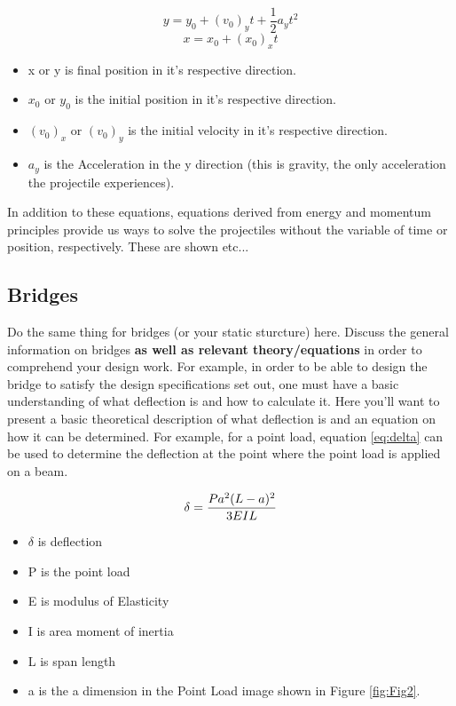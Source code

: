 \documentclass[fleqn,12pt]{project}
\begin{document}
\begin{equation}
	y = y_0 + (v_0)_yt + \frac{1}{2}a_yt^2
\label{eq:y}
\end{equation}
\begin{equation}
	x = x_0 + (x_0)_xt
\label{eq:x}
\end{equation}
\begin{itemize}
\item x or y is final position in it's respective direction.
\item $x_0$ or $y_0$ is the initial position in it's respective direction.
\item $(v_0)_x$ or $(v_0)_y$ is the initial velocity in it's respective direction.
\item $a_y$ is the Acceleration in the y direction (this is gravity, the only acceleration the projectile experiences).
\end{itemize}


In addition to these equations, equations derived from energy and momentum principles provide us ways to solve the projectiles without the variable of time or position, respectively. These are shown etc...
\subsection{Bridges}

Do the same thing for bridges (or your static sturcture) here. Discuss the general information on bridges \textbf{as well as relevant theory/equations} in order to comprehend your design work. For example, in order to be able to design the bridge to satisfy the design specifications set out, one must have a basic understanding of what deflection is and how to calculate it. Here you'll want to present a basic theoretical description of what deflection is and an equation on how it can be determined. For example, for a point load, equation \ref{eq:delta}  can be used to determine the deflection at the point where the point load is applied on a beam. 

\begin{equation}
	\delta = \frac{Pa^2(L-a)^2}{3EIL} \\
\label{eq:delta}
\end{equation}

\begin{itemize}
\item $\delta$ is deflection
\item P is the point load
\item E is modulus of Elasticity
\item I is area moment of inertia
\item L is span length
\item a is the a dimension in the Point Load image shown in Figure \ref{fig:Fig2}.
\end{itemize}
\end{document}
